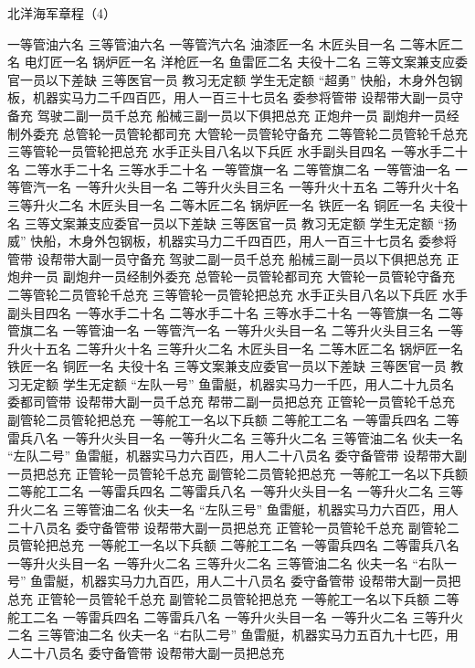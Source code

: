 \documentclass[12pt,UTF8]{ctexbook}
\begin{document}
北洋海军章程（4）

一等管油六名
三等管油六名
一等管汽六名
油漆匠一名
木匠头目一名
二等木匠二名
电灯匠一名
锅炉匠一名
洋枪匠一名
鱼雷匠二名
夫役十二名
三等文案兼支应委官一员以下差缺
三等医官一员
教习无定额
学生无定额
“超勇”
快船，木身外包钢板，机器实马力二千四百匹，用人一百三十七员名
委参将管带
设帮带大副一员守备充
驾驶二副一员千总充
船械三副一员以下俱把总充
正炮弁一员
副炮弁一员经制外委充
总管轮一员管轮都司充
大管轮一员管轮守备充
二等管轮二员管轮千总充
三等管轮一员管轮把总充
水手正头目八名以下兵匠
水手副头目四名
一等水手二十名
二等水手二十名
三等水手二十名
一等管旗一名
二等管旗二名
一等管油一名
一等管汽一名
一等升火头目一名
二等升火头目三名
一等升火十五名
二等升火十名
三等升火二名
木匠头目一名
二等木匠二名
锅炉匠一名
铁匠一名
铜匠一名
夫役十名
三等文案兼支应委官一员以下差缺
三等医官一员
教习无定额
学生无定额
“扬威”
快船，木身外包钢板，机器实马力二千四百匹，用人一百三十七员名
委参将管带
设帮带大副一员守备充
驾驶二副一员千总充
船械三副一员以下俱把总充
正炮弁一员
副炮弁一员经制外委充
总管轮一员管轮都司充
大管轮一员管轮守备充
二等管轮二员管轮千总充
三等管轮一员管轮把总充
水手正头目八名以下兵匠
水手副头目四名
一等水手二十名
二等水手二十名
三等水手二十名
一等管旗一名
二等管旗二名
一等管油一名
一等管汽一名
一等升火头目一名
二等升火头目三名
一等升火十五名
二等升火十名
三等升火二名
木匠头目一名
二等木匠二名
锅炉匠一名
铁匠一名
铜匠一名
夫役十名
三等文案兼支应委官一员以下差缺
三等医官一员
教习无定额
学生无定额
“左队一号”
鱼雷艇，机器实马力一千匹，用人二十九员名
委都司管带
设帮带大副一员千总充
帮带二副一员把总充
正管轮一员管轮千总充
副管轮二员管轮把总充
一等舵工一名以下兵额
二等舵工二名
一等雷兵四名
二等雷兵八名
一等升火头目一名
一等升火二名
三等升火二名
三等管油二名
伙夫一名
“左队二号”
鱼雷艇，机器实马力六百匹，用人二十八员名
委守备管带
设帮带大副一员把总充
正管轮一员管轮千总充
副管轮二员管轮把总充
一等舵工一名以下兵额
二等舵工二名
一等雷兵四名
二等雷兵八名
一等升火头目一名
一等升火二名
三等升火二名
三等管油二名
伙夫一名
“左队三号”
鱼雷艇，机器实马力六百匹，用人二十八员名
委守备管带
设帮带大副一员把总充
正管轮一员管轮千总充
副管轮二员管轮把总充
一等舵工一名以下兵额
二等舵工二名
一等雷兵四名
二等雷兵八名
一等升火头目一名
一等升火二名
三等升火二名
三等管油二名
伙夫一名
“右队一号”
鱼雷艇，机器实马力九百匹，用人二十八员名
委守备管带
设帮带大副一员把总充
正管轮一员管轮千总充
副管轮二员管轮把总充
一等舵工一名以下兵额
二等舵工二名
一等雷兵四名
二等雷兵八名
一等升火头目一名
一等升火二名
三等升火二名
三等管油二名
伙夫一名
“右队二号”
鱼雷艇，机器实马力五百九十七匹，用人二十八员名
委守备管带
设帮带大副一员把总充
\end{document}
